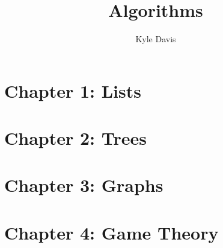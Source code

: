 \documentclass{tufte-book} %
\title{Algorithms} %
\author{Kyle Davis} %
\begin{document}
\frontmatter

\maketitle %
\tableofcontents %


%  


\mainmatter

\chapter{Chapter 1: Lists}
\label{ch:1}


\chapter{Chapter 2: Trees}
\label{ch:2}


\chapter{Chapter 3: Graphs}
\label{ch:3}


\chapter{Chapter 4: Game Theory}
\label{ch:4}




\backmatter


%  

%  


\printindex %
\end{document}
